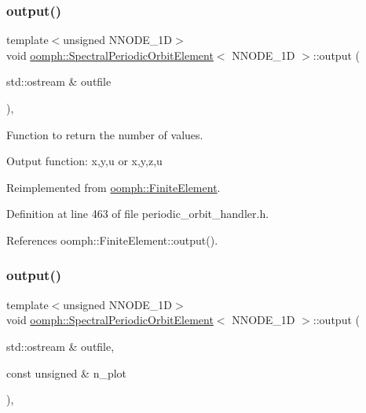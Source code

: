 \subsubsection{\texorpdfstring{output()}{output()}\hspace{0.1cm}{\footnotesize\ttfamily [1/4]}}
{\footnotesize\ttfamily template$<$unsigned N\+N\+O\+D\+E\+\_\+1D$>$ \\
void \hyperlink{classoomph_1_1SpectralPeriodicOrbitElement}{oomph\+::\+Spectral\+Periodic\+Orbit\+Element}$<$ N\+N\+O\+D\+E\+\_\+1D $>$\+::output (\begin{DoxyParamCaption}\item[{std\+::ostream \&}]{outfile }\end{DoxyParamCaption})\hspace{0.3cm}{\ttfamily [inline]}, {\ttfamily [virtual]}}



Function to return the number of values. 

Output function\+: x,y,u or x,y,z,u 

Reimplemented from \hyperlink{classoomph_1_1FiniteElement_a2ad98a3d2ef4999f1bef62c0ff13f2a7}{oomph\+::\+Finite\+Element}.



Definition at line 463 of file periodic\+\_\+orbit\+\_\+handler.\+h.



References oomph\+::\+Finite\+Element\+::output().

\mbox{\label{classoomph_1_1SpectralPeriodicOrbitElement_ab4c88a199b195d8e06630c4750ce06cf}} 
\subsubsection{\texorpdfstring{output()}{output()}\hspace{0.1cm}{\footnotesize\ttfamily [2/4]}}
{\footnotesize\ttfamily template$<$unsigned N\+N\+O\+D\+E\+\_\+1D$>$ \\
void \hyperlink{classoomph_1_1SpectralPeriodicOrbitElement}{oomph\+::\+Spectral\+Periodic\+Orbit\+Element}$<$ N\+N\+O\+D\+E\+\_\+1D $>$\+::output (\begin{DoxyParamCaption}\item[{std\+::ostream \&}]{outfile,  }\item[{const unsigned \&}]{n\+\_\+plot }\end{DoxyParamCaption})\hspace{0.3cm}{\ttfamily [inline]}, {\ttfamily [virtual]}}



